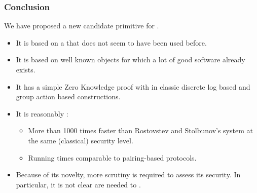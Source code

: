 \documentclass{beamer}
\renewcommand{\emph}[1]{}
\begin{document}

\begin{frame}
  \frametitle{Conclusion}
  
  We have proposed a new candidate primitive for \emph{post-quantum cryptography}.

  \begin{itemize}
  \item It is based on a \emph{new group theoretic construction} that
    does not seem to have been used before.
  \item It is based on well known objects for which a lot of good
    software already exists.
  \item It has a simple Zero Knowledge proof with \emph{no analogue}
    in classic discrete log based and group action based
    constructions.
  \item It is reasonably \emph{fast}:
    \begin{itemize}
    \item More than 1000 times faster than Rostovstev and Stolbunov's
      system at the same (classical) security level.
    \item Running times comparable to pairing-based protocols.
    \end{itemize}
  \item Because of its novelty, more scrutiny is required to assess
    its security. In particular, it is not clear \emph{what mathematical
    assumptions} are needed to \emph{prove its security}.
  \end{itemize}
\end{frame}
\end{document}
